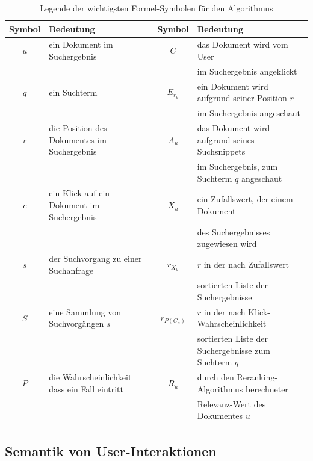 \begin{table}[H]
\centering
\vspace{-.5em}
\caption[Legende der wichtigsten Formel-Symbolen für den Algorithmus]{Legende der wichtigsten Formel-Symbolen für den Algorithmus}
\label{tab:LegendeSymboleFormelnAlgorithmus}
\vspace{-.5em}
\footnotesize
\renewcommand*{\arraystretch}{1.2}
\begin{tabular}{clcl} \hline
\textbf{Symbol} & \textbf{Bedeutung} & \textbf{Symbol} & \textbf{Bedeutung} \\ \hline
$u$	& ein Dokument im Suchergebnis & $C$	& das Dokument wird vom User \\ &&& im Suchergebnis angeklickt \\ 
$q$	& ein Suchterm & $E_{r_{u}}$	& ein Dokument wird aufgrund seiner Position $r$ \\ &&& im Suchergebnis angeschaut \\
$r$	& die Position des Dokumentes im Suchergebnis &  $A_{u}$	& das Dokument wird aufgrund seines Suchsnippets \\ &&& im Suchergebnis, zum Suchterm $q$ angeschaut \\ 
$c$	& ein Klick auf ein Dokument im Suchergebnis & $X_{u}$	& ein Zufallswert, der einem Dokument \\ &&& des Suchergebnisses zugewiesen wird \\
$s$ 	& der Suchvorgang zu einer Suchanfrage & $r_{X_{u}}$	& $r$ in der nach Zufallswert \\ &&& sortierten Liste der Suchergebnisse \\ 
$S$	& eine Sammlung von Suchvorgängen $s$ & $r_{P(C_{u})}$ 	& $r$ in der nach Klick-Wahrscheinlichkeit \\ &&& sortierten Liste der Suchergebnisse zum Suchterm $q$\\
$P$	& die Wahrscheinlichkeit dass ein Fall eintritt &  $R_{u}$	& durch den Reranking-Algorithmus berechneter \\ &&& Relevanz-Wert des Dokumentes $u$ \\
\hline
\end{tabular}
\vspace{-2em}
\end{table}


\subsection{Semantik von User-Interaktionen}
\label{sec:Grundlagen:Grundbegriffe:SemantikUserInteraktionen}

